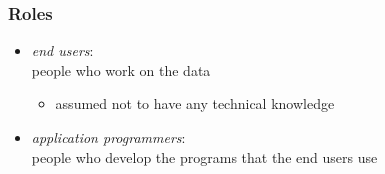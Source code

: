 \documentclass[dvipsnames]{beamer}
\theoremstyle{plain}
\begin{document}
\begin{frame}
  \frametitle{Roles}

  \begin{itemize}
    \item \emph{end users}:\\
      people who work on the data
    \begin{itemize}
      \item assumed not to have any technical knowledge
    \end{itemize}

    \pause
    \bigskip
    \item \emph{application programmers}:\\
      people who develop the programs that the end users use
  \end{itemize}
\end{frame}
\end{document}
